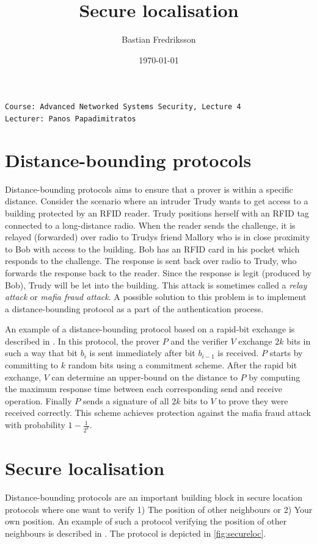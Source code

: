 \documentclass{article}
\title{Secure localisation}
\author{Bastian Fredriksson}
\date{\today}
\begin{document}
\maketitle
\noindent
\verb!Course: Advanced Networked Systems Security, Lecture 4!\\
\verb!Lecturer: Panos Papadimitratos!
\section{Distance-bounding protocols}
Distance-bounding protocols aims to ensure that a prover is within a specific distance. Consider the scenario where an intruder Trudy wants to get access to a building protected by an RFID reader. Trudy positions herself with an RFID tag connected to a long-distance radio. When the reader sends the challenge, it is relayed (forwarded) over radio to Trudys friend Mallory who is in close proximity to Bob with access to the building. Bob has an RFID card in his pocket which responds to the challenge. The response is sent back over radio to Trudy, who forwards the response back to the reader. Since the response is legit (produced by Bob), Trudy will be let into the building. This attack is sometimes called a \textit{relay attack} or \textit{mafia fraud attack}. A possible solution to this problem is to implement a distance-bounding protocol as a part of the authentication process.

An example of a distance-bounding protocol based on a rapid-bit exchange is described in \cite{Brands1994}. In this protocol, the prover $P$ and the verifier $V$ exchange $2k$ bits in such a way that bit $b_{i}$ is sent immediately after bit $b_{i-1}$ is received. $P$ starts by committing to $k$ random bits using a commitment scheme. After the rapid bit exchange, $V$ can determine an upper-bound on the distance to $P$ by computing the maximum response time between each corresponding send and receive operation. Finally $P$ sends a signature of all $2k$ bits to $V$ to prove they were received correctly. This scheme achieves protection against the mafia fraud attack with probability $1-\frac{1}{2^k}$.
\section{Secure localisation}
Distance-bounding protocols are an important building block in secure location protocols where one want to verify 1) The position of other neighbours or 2) Your own position. An example of such a protocol verifying the position of other neighbours is described in \cite{fiore13}. The protocol is depicted in \ref{fig:secureloc}.
\end{document}
